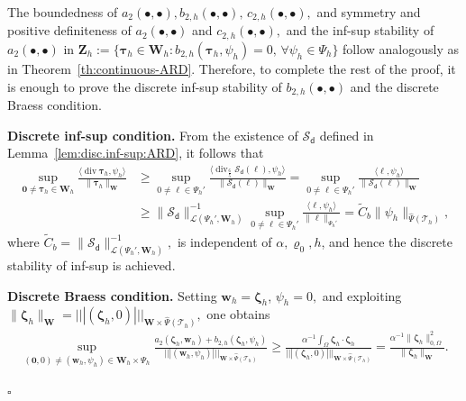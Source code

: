 \documentclass[10pt,a4paper]{amsart}
\newcommand{\bW}{\mathbf{W}}
\newcommand{\bZ}{\mathbf{Z}}
\newcommand\btau{\boldsymbol{\tau}}
\newcommand{\bw}{\boldsymbol{w}}
\newcommand\bzero{\boldsymbol{0}}
\newcommand\bzeta{\boldsymbol{\zeta}}
\newcommand{\cL}{\mathcal{L}}
\newcommand{\cS}{\mathcal{S}}
\newcommand{\cT}{\mathcal{T}}
\newenvironment{proof}{\noindent{\it Proof.}}{\hfill$\square$}
\newcommand*\tnorm[1]{|\!|\!| #1 |\!|\!|}
\newcommand\vdiv{\mathop{\mathrm{div}}\nolimits}
\begin{document}
\begin{proof}
     The boundedness of \(a_2(\bullet,\bullet),b_{2,h}(\bullet,\bullet),\,c_{2,h}(\bullet,\bullet),\) and  symmetry and positive definiteness of \(a_2(\bullet,\bullet)\) and \(c_{2,h}(\bullet,\bullet),\) and the inf-sup stability of \(a_2(\bullet,\bullet)\) in \(\bZ_h:=\{\btau_h\in\bW_h:b_{2,h}(\btau_h,\psi_h)=0,\,\forall \psi_h\in\Psi_h\}\) follow analogously as in Theorem~\ref{th:continuous-ARD}. Therefore, to complete the rest of the proof, it is enough to prove the discrete inf-sup stability of \(b_{2,h}(\bullet,\bullet)\) and the discrete Braess condition.

\smallskip
\noindent\textbf{Discrete inf-sup condition.} %
From the existence of $\cS_{\mathsf{d}}$ defined in Lemma~\ref{lem:disc.inf-sup:ARD}, it %
    follows that
\begin{align*}
\sup_{\bzero\neq\btau_h \in \bW_h} \!\!\frac{\langle{\vdiv} \btau_h, \psi_h\rangle}{\|\btau_h\|_\bW} &\geq \sup_{0\neq\ell \in \Psi_h'} \frac{\langle{{\vdiv}_{\frac65}} \cS_{\mathsf{d}}(\ell), \psi_h\rangle}{\|\cS_{\mathsf{d}}(\ell)\|_\bW} = \sup_{0\neq\ell \in \Psi_h'} \frac{\langle \ell, \psi_h \rangle}{\|\cS_{\mathsf{d}}(\ell)\|_\bW} \\&\geq \|\cS_{\mathsf{d}}\|^{-1}_{\cL(\Psi_h', \bW_h)} \sup_{0\neq\ell \in \Psi_h'} \frac{\langle \ell, \psi_h \rangle}{\|\ell\|_{\Psi_h'}} = \tilde{C}_b \|\psi_h\|_{\widehat{\Psi}(\cT_h)},
\end{align*}
where $\tilde{C}_b = \|\cS_{\mathsf{d}}\|^{-1}_{\cL(\Psi_h', \bW_h)},$ is independent of \(\alpha,\varrho_0,h\), and hence the discrete stability of inf-sup is achieved.

\smallskip
\noindent\textbf{Discrete Braess condition.} Setting \(\bw_h=\bzeta_h\), \(\psi_h=0,\) and exploiting \(\|\bzeta_h\|_{\bW}=\tnorm{(\bzeta_h,0)}_{\bW\times\widehat{\Psi}(\cT_h)},\) one obtains 
\begin{align}\label{eq:Braess.disc.1st} \sup_{(\bzero,0)\neq(\bw_h,\psi_h)\in\bW_h\times\Psi_h}\frac{a_2(\bzeta_h,\bw_h)+b_{2,h}(\bzeta_h,\psi_h)}{\tnorm{(\bw_h,\psi_h)}_{\bW\times\widehat{\Psi}(\cT_h)}}\geq\frac{\alpha^{-1}\int_\Omega\bzeta_h\cdot\bzeta_h}{\tnorm{(\bzeta_h,0)}_{\bW\times\widehat{\Psi}(\cT_h)}}=\frac{\alpha^{-1}\|\bzeta_h\|_{0,\Omega}^2}{\|\bzeta_h\|_{\bW}}.
    \end{align}
     

\end{proof}
\end{document}

